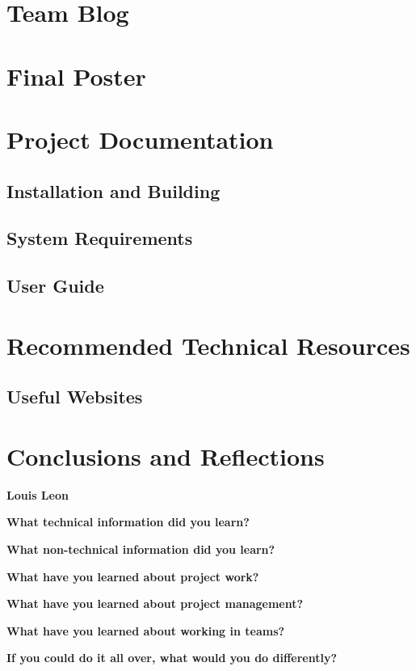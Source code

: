 \documentclass[onecolumn, draftclsnofoot,10pt, compsoc]{IEEEtran}
\begin{document}
\section{Team Blog}

\section{Final Poster}

\section{Project Documentation}
\subsection{Installation and Building}

\subsection{System Requirements}

\subsection{User Guide}

\section{Recommended Technical Resources}
\subsection{Useful Websites}

\section{Conclusions and Reflections}
\begin{flushleft}
{\large\textbf{Louis Leon}\par}
\textbf{What technical information did you learn?}\par

\textbf{What non-technical information did you learn?}\par

\textbf{What have you learned about project work?}\par

\textbf{What have you learned about project management?}\par

\textbf{What have you learned about working in teams?}\par

\textbf{If you could do it all over, what would you do differently?}\par

\end{flushleft}
\end{document}
